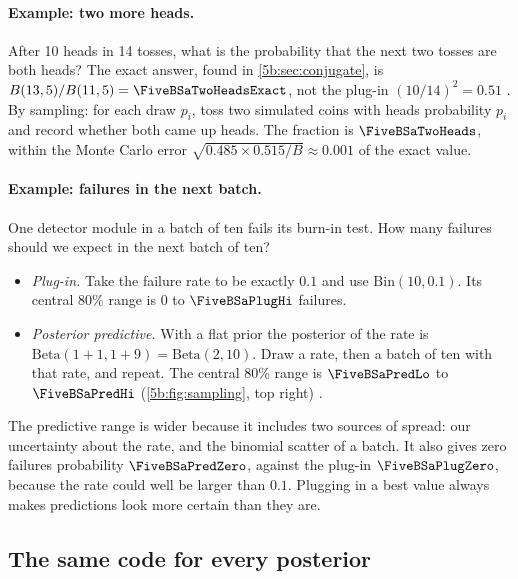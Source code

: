 \paragraph{Example: two more heads.} After 10 heads in 14 tosses, what is the probability
that the next two tosses are both heads? The exact answer, found in
\cref{5b:sec:conjugate}, is $B(13,5)/B(11,5)=\FiveBSaTwoHeadsExact$, not the plug-in
$(10/14)^2=0.51$ . By sampling: for each draw $p_i$, toss two
simulated coins with heads probability $p_i$ and record whether both came up heads. The
fraction is $\FiveBSaTwoHeads$, within the Monte Carlo error $\sqrt{0.485\times0.515/B}
\approx0.001$ of the exact value.

\paragraph{Example: failures in the next batch.} One detector module in a batch of ten
fails its burn-in test. How many failures should we expect in the next batch of ten?
\begin{itemize}[itemsep=1pt,leftmargin=1.2em]
  \item \emph{Plug-in.} Take the failure rate to be exactly $0.1$ and use
        $\mathrm{Bin}(10,0.1)$. Its central 80\% range is $0$ to $\FiveBSaPlugHi$
        failures.
  \item \emph{Posterior predictive.} With a flat prior the posterior of the rate is
        $\mathrm{Beta}(1+1,1+9)=\mathrm{Beta}(2,10)$. Draw a rate, then a batch of ten
        with that rate, and repeat. The central 80\% range is $\FiveBSaPredLo$ to
        $\FiveBSaPredHi$ (\cref{5b:fig:sampling}, top right) .
\end{itemize}
The predictive range is wider because it includes two sources of spread: our
uncertainty about the rate, and the binomial scatter of a batch. It also gives zero
failures probability $\FiveBSaPredZero$, against the plug-in $\FiveBSaPlugZero$, because
the rate could well be larger than $0.1$. Plugging in a best value always makes
predictions look more certain than they are.

\subsection{The same code for every posterior}


